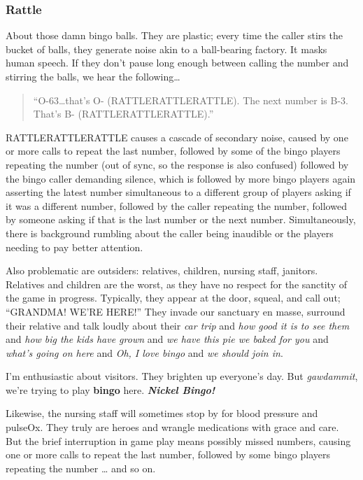 \documentclass[
  letterpaper,
  DIV=11,
  numbers=noendperiod]{scrreprt}
\begin{document}
\subsubsection*{Rattle}\label{rattle}

About those damn bingo balls. They are plastic; every time the caller
stirs the bucket of balls, they generate noise akin to a ball-bearing
factory. It masks human speech. If they don't pause long enough between
calling the number and stirring the balls, we hear the following\ldots{}

\begin{quote}
``O-63\ldots that's O- (RATTLERATTLERATTLE). The next number is B-3.
That's B- (RATTLERATTLERATTLE).''
\end{quote}

RATTLERATTLERATTLE causes a cascade of secondary noise, caused by one or
more calls to repeat the last number, followed by some of the bingo
players repeating the number (out of sync, so the response is also
confused) followed by the bingo caller demanding silence, which is
followed by more bingo players again asserting the latest number
simultaneous to a different group of players asking if it was a
different number, followed by the caller repeating the number, followed
by someone asking if that is the last number or the next number.
Simultaneously, there is background rumbling about the caller being
inaudible or the players needing to pay better attention.

Also problematic are outsiders: relatives, children, nursing staff,
janitors. Relatives and children are the worst, as they have no respect
for the sanctity of the game in progress. Typically, they appear at the
door, squeal, and call out; ``GRANDMA! WE'RE HERE!'' They invade our
sanctuary en masse, surround their relative and talk loudly about their
\emph{car trip} and \emph{how good it is to see them} and \emph{how big
the kids have grown} and \emph{we have this pie we baked for you} and
\emph{what's going on here} and \emph{Oh, I love bingo} and \emph{we
should join in}.

I'm enthusiastic about visitors. They brighten up everyone's day. But
\emph{gawdammit}, we're trying to play \textbf{bingo} here.
\textbf{\emph{Nickel Bingo!}}

Likewise, the nursing staff will sometimes stop by for blood pressure
and pulseOx. They truly are heroes and wrangle medications with grace
and care. But the brief interruption in game play means possibly missed
numbers, causing one or more calls to repeat the last number, followed
by some bingo players repeating the number \ldots{} and so on.
\end{document}
